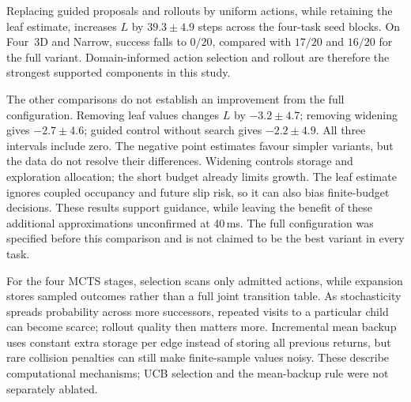 Replacing guided proposals and rollouts by uniform actions, while retaining
the leaf estimate, increases $L$ by $39.3\pm4.9$ steps across the four-task
seed blocks. On Four~3D and Narrow, success falls to $0/20$, compared with
$17/20$ and $16/20$ for the full variant. Domain-informed action selection
and rollout are therefore the strongest supported components in this study.

The other comparisons do not establish an improvement from the full
configuration. Removing leaf values changes $L$ by $-3.2\pm4.7$;
removing widening gives $-2.7\pm4.6$; guided control without search gives
$-2.2\pm4.9$. All three intervals include zero. The negative point estimates
favour simpler variants, but the data do not resolve their differences.
Widening controls storage and exploration allocation; the short budget already
limits growth. The leaf estimate ignores coupled occupancy and future slip
risk, so it can also bias finite-budget decisions. These results support
guidance, while leaving the benefit of these additional approximations
unconfirmed at 40\,ms. The full configuration was specified before this
comparison and is not claimed to be the best variant in every task.

For the four MCTS stages, selection scans only admitted actions, while
expansion stores sampled outcomes rather than a full joint transition table.
As stochasticity spreads probability across more successors, repeated visits
to a particular child can become scarce; rollout quality then matters more.
Incremental mean backup uses constant extra storage per edge instead of
storing all previous returns, but rare collision penalties can still make
finite-sample values noisy. These describe computational mechanisms; UCB
selection and the mean-backup rule were not separately ablated.

